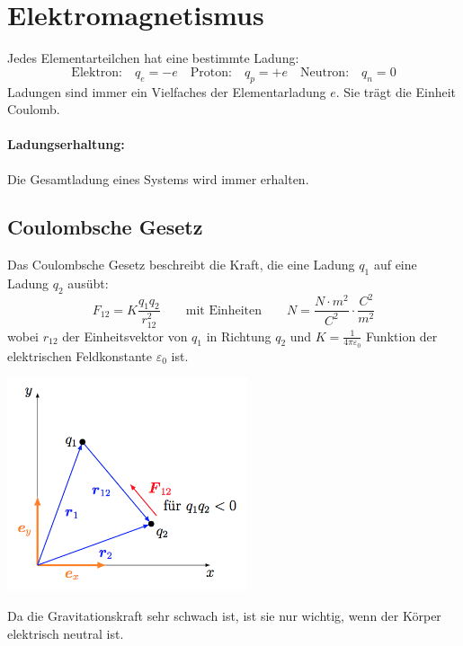 \documentclass[11pt]{article}
\begin{document}
\section{Elektromagnetismus}

Jedes Elementarteilchen hat eine bestimmte Ladung:
\begin{equation*}
	\text{Elektron:}\quad q_e = -e \quad\text{Proton:}\quad q_p = +e \quad\text{Neutron:}\quad q_n = 0
\end{equation*}
Ladungen sind immer ein Vielfaches der Elementarladung $e$. Sie tr{\"a}gt die Einheit Coulomb. 

\paragraph{Ladungserhaltung:} Die Gesamtladung eines Systems wird immer erhalten.

\subsection{Coulombsche Gesetz}

Das Coulombsche Gesetz beschreibt die Kraft, die eine Ladung $q_1$ auf eine Ladung $q_2$ aus{\"u}bt:
\begin{equation*}
	F_{12} = K\frac{q_1 q_2}{r_{12}^2} \qquad\text{mit Einheiten}\qquad N = \frac{N\cdot m^2}{C^2}\cdot\frac{C^2}{m^2}
\end{equation*}
wobei $r_{12}$ der Einheitsvektor von $q_1$ in Richtung $q_2$ und $K = \frac{1}{4\pi\varepsilon_0}$ Funktion der elektrischen Feldkonstante $\varepsilon_0$ ist.

\begin{center}
	\includegraphics[width=200pt]{images/coulomb}
\end{center}

Da die Gravitationskraft sehr schwach ist, ist sie nur wichtig, wenn der K{\"o}rper elektrisch neutral ist.
\end{document}

